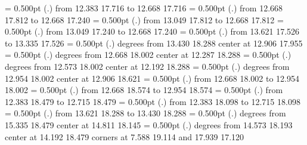 {%
\linethickness= 0.500pt
\setplotsymbol ({\thinlinefont .})
{\color[rgb]{0,0,0}\putrule from 12.383 17.716 to 12.668 17.716
}%
%
%
\linethickness= 0.500pt
\setplotsymbol ({\thinlinefont .})
{\color[rgb]{0,0,0}\putrule from 12.668 17.812 to 12.668 17.240
}%
%
%
\linethickness= 0.500pt
\setplotsymbol ({\thinlinefont .})
{\color[rgb]{0,0,0}\putrule from 13.049 17.812 to 12.668 17.812
}%
%
%
\linethickness= 0.500pt
\setplotsymbol ({\thinlinefont .})
{\color[rgb]{0,0,0}\putrule from 13.049 17.240 to 12.668 17.240
}%
%
%
\linethickness= 0.500pt
\setplotsymbol ({\thinlinefont .})
{\color[rgb]{0,0,0}\putrule from 13.621 17.526 to 13.335 17.526
}%
%
%
\linethickness= 0.500pt
\setplotsymbol ({\thinlinefont .})
{\color[rgb]{0,0,0} degrees from 13.430 18.288 center at 12.906 17.955
}%
%
%
\linethickness= 0.500pt
\setplotsymbol ({\thinlinefont .})
{\color[rgb]{0,0,0} degrees from 12.668 18.002 center at 12.287 18.288
}%
%
%
\linethickness= 0.500pt
\setplotsymbol ({\thinlinefont .})
{\color[rgb]{0,0,0} degrees from 12.573 18.002 center at 12.192 18.288
}%
%
%
\linethickness= 0.500pt
\setplotsymbol ({\thinlinefont .})
{\color[rgb]{0,0,0} degrees from 12.954 18.002 center at 12.906 18.621
}%
%
%
\linethickness= 0.500pt
\setplotsymbol ({\thinlinefont .})
{\color[rgb]{0,0,0}\putrule from 12.668 18.002 to 12.954 18.002
}%
%
%
\linethickness= 0.500pt
\setplotsymbol ({\thinlinefont .})
{\color[rgb]{0,0,0}\putrule from 12.668 18.574 to 12.954 18.574
}%
%
%
\linethickness= 0.500pt
\setplotsymbol ({\thinlinefont .})
{\color[rgb]{0,0,0}\putrule from 12.383 18.479 to 12.715 18.479
}%
%
%
\linethickness= 0.500pt
\setplotsymbol ({\thinlinefont .})
{\color[rgb]{0,0,0}\putrule from 12.383 18.098 to 12.715 18.098
}%
%
%
\linethickness= 0.500pt
\setplotsymbol ({\thinlinefont .})
{\color[rgb]{0,0,0}\putrule from 13.621 18.288 to 13.430 18.288
}%
%
%
\linethickness= 0.500pt
\setplotsymbol ({\thinlinefont .})
{\color[rgb]{0,0,0} degrees from 15.335 18.479 center at 14.811 18.145
}%
%
%
\linethickness= 0.500pt
\setplotsymbol ({\thinlinefont .})
{\color[rgb]{0,0,0} degrees from 14.573 18.193 center at 14.192 18.479
}%
\linethickness=0pt
\putrectangle corners at  7.588 19.114 and 17.939 17.120
\endpicture}
